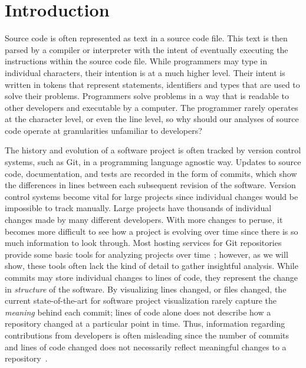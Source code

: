 \section{Introduction}

Source code is often represented as text in a source code file. This text is then parsed by a compiler or interpreter with the intent of eventually executing the instructions within the source code file. While programmers may type in individual characters, their intention is at a much higher level. Their intent is written in tokens that represent statements, identifiers and types that are used to solve their problems. Programmers solve problems in a way that is readable to other developers and executable by a computer. The programmer rarely operates at the character level, or even the line level, so why should our analyses of source code operate at granularities unfamiliar to developers?

The history and evolution of a software project is often tracked by version control systems, such as Git, in a programming language agnostic way. Updates to source code, documentation, and tests are recorded in the form of commits, which show the differences in lines between each subsequent revision of the software. Version control systems become vital for large projects since individual changes would be impossible to track manually. Large projects have thousands of individual changes made by many different developers. With more changes to peruse, it becomes more difficult to see how a project is evolving over time since there is so much information to look through. Most hosting services for Git repositories provide some basic tools for analyzing projects over time~\cite{github-graphs,bitbucket-graphs}; however, as we will show, these tools often lack the kind of detail to gather insightful analysis. While commits may store individual changes to lines of code, they represent the change in \emph{structure} of the software.  By visualizing lines changed, or files changed, the current state-of-the-art for software project visualization rarely capture the \emph{meaning} behind each commit; lines of code alone does not describe how a repository changed at a particular point in time. Thus, information regarding contributions from developers is often misleading since the number of commits and lines of code changed does not necessarily reflect meaningful changes to a repository~\cite{robles2014}.

